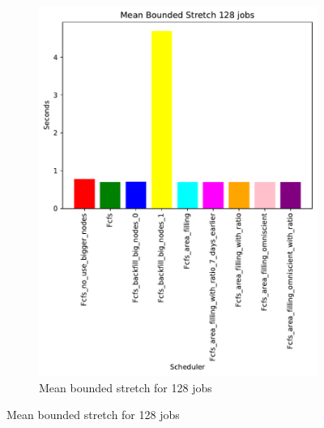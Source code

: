 \documentclass[a4paper]{article}
\begin{document}
\begin{figure}[H]
\begin{subfigure}[b]{0.4\linewidth}\centering\includegraphics[width=0.95\linewidth]{MBSS/plot/Size_Constraint_2022-01-17->2022-01-17_V85105_Mean_Stretch_With_a_Minimum_128_450_128_32_256_4_1024.pdf}\caption{Mean bounded stretch for 128 jobs}\label{45}\end{subfigure}

\end{figure}
\end{document}
